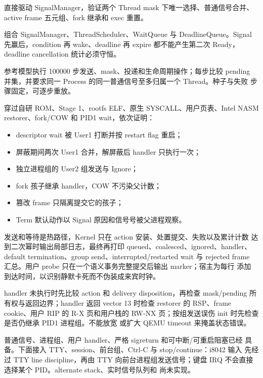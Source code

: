 直接驱动 SignalManager，验证两个 Thread mask 下唯一选择、普通信号合并、
active frame 五元组、fork 继承和 exec 重置。

组合 SignalManager、ThreadScheduler、WaitQueue 与 DeadlineQueue。Signal
先赢后，condition 再 wake、deadline 再 expire 都不能产生第二次 Ready，
deadline cancellation 统计必须守恒。

参考模型执行 100000 步发送、mask、投递和生命周期操作；每步比较 pending
并集，并要求同一 Process 的同一普通信号至多归属一个 Thread。种子与失败
步骤固定，可逐步重放。

 穿过自研 ROM、Stage 1、rootfs ELF、原生
SYSCALL、用户页表、Intel NASM restorer、fork/COW 和 PID1 wait，依次证明：

\begin{itemize}
  \item descriptor wait 被 User1 打断并按 restart flag 重启；
  \item 屏蔽期间两次 User1 合并，解屏蔽后 handler 只执行一次；
  \item 独立进程组的 User2 组发送与 Ignore；
  \item fork 孩子继承 handler，COW 不污染父计数；
  \item 篡改 frame 只隔离提交它的孩子；
  \item Term 默认动作以 Signal 原因和信号号被父进程观察。
\end{itemize}

发送和等待是热路径，Kernel 只在 action 安装、处置提交、失败以及累计计数
达到二次幂时输出局部日志，最终再打印 queued、coalesced、ignored、handler、
default termination、group send、interrupted/restarted wait 与 rejected
frame 汇总。用户 probe 只在一个语义事务完整提交后输出 marker；宿主为每行
添加 \code{[QEMU][T+...ms]} 到达时间，以识别静默卡死而不伪装成来宾时钟。

handler 未执行时先比较 action 和 delivery disposition，再检查 mask/pending
所有权与返回边界；handler 返回 vector 13 时检查 restorer 的 RSP、frame
cookie、用户 RIP 的 R-X 页和用户栈的 RW-NX 页；按组发送误伤 init 时先检查
是否仍继承 PID1 进程组。不能放宽  或扩大 QEMU
timeout 来掩盖状态错误。

普通信号、进程组、用户 handler、严格 sigreturn 和可中断/可重启阻塞已经
具备。下面接入 TTY、session、前台组、Ctrl-C 与 stop/continue：i8042 输入
先经过 TTY line discipline，再由 TTY 向前台进程组发送信号；键盘 IRQ
不会直接选择某个 PID。alternate stack、实时信号队列和
 尚未实现。
